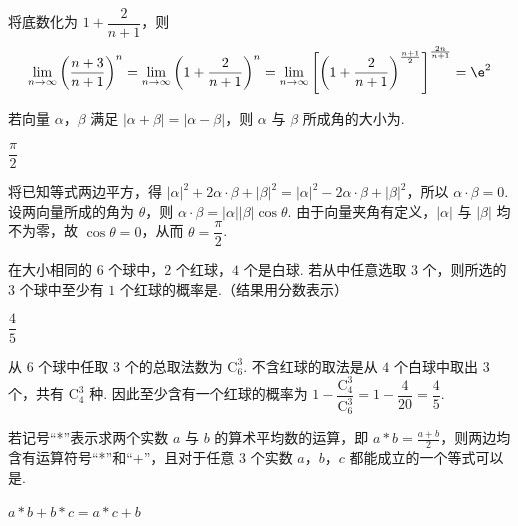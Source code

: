 \begin{solution}
将底数化为 \(1+\dfrac{2}{n+1}\)，则
\[
\displaystyle\lim_{n\to\infty}\left(\frac{n+3}{n+1}\right)^{n}=\lim_{n\to\infty}\left(1+\frac{2}{n+1}\right)^{n}=\lim_{n\to\infty}\left[\left(1+\frac{2}{n+1}\right)^{\frac{n+1}{2}}\right]^{\frac{2n}{n+1}}=\e^{2}
\]
\end{solution}

\begin{problem}
若向量 \(\alpha\)，\(\beta\) 满足 \(|\alpha+\beta|=|\alpha-\beta|\)，则 \(\alpha\) 与 \(\beta\) 所成角的大小为\fillinblank{}.
\end{problem}

\begin{answer}
\(\dfrac{\pi}{2}\)
\end{answer}

\begin{solution}
将已知等式两边平方，得 \(|\alpha|^{2}+2\alpha\cdot\beta+|\beta|^{2}=|\alpha|^{2}-2\alpha\cdot\beta+|\beta|^{2}\)，所以 \(\alpha\cdot\beta=0\). 设两向量所成的角为 \(\theta\)，则 \(\alpha\cdot\beta=|\alpha||\beta|\cos\theta\). 由于向量夹角有定义，\(|\alpha|\) 与 \(|\beta|\) 均不为零，故 \(\cos\theta=0\)，从而 \(\theta=\dfrac{\pi}{2}\).
\end{solution}

\begin{problem}
在大小相同的 \(6\) 个球中，\(2\) 个红球，\(4\) 个是白球. 若从中任意选取 \(3\) 个，则所选的 \(3\) 个球中至少有 \(1\) 个红球的概率是\fillinblank{}.（结果用分数表示）
\end{problem}

\begin{answer}
\(\dfrac{4}{5}\)
\end{answer}

\begin{solution}
从 \(6\) 个球中任取 \(3\) 个的总取法数为 \(\mathrm C_6^3\). 不含红球的取法是从 \(4\) 个白球中取出 \(3\) 个，共有 \(\mathrm C_4^3\) 种. 因此至少含有一个红球的概率为 \(1-\dfrac{\mathrm C_4^3}{\mathrm C_6^3}=1-\dfrac{4}{20}=\dfrac{4}{5}\).
\end{solution}

\begin{problem}
若记号“*”表示求两个实数 \(a\) 与 \(b\) 的算术平均数的运算，即 \(a\ast b=\frac{a+b}{2}\)，则两边均含有运算符号“*”和“+”，且对于任意 \(3\) 个实数 \(a\)，\(b\)，\(c\) 都能成立的一个等式可以是\fillinblank{}.
\end{problem}

\begin{answer}
\(a\ast b+b\ast c=a\ast c+b\)
\end{answer}

